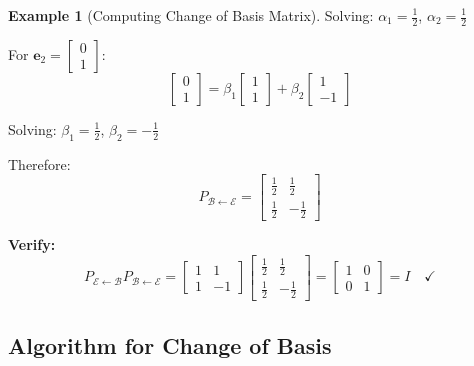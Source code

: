 \documentclass[12pt,a4paper]{article}
\theoremstyle{definition}
\newtheorem{example}{Example}[section]
\begin{document}
\begin{example}[Computing Change of Basis Matrix]
Solving: $\alpha_1 = \frac{1}{2}$, $\alpha_2 = \frac{1}{2}$

For $\mathbf{e}_2 = \begin{bmatrix} 0 \\ 1 \end{bmatrix}$:
\begin{equation}
\begin{bmatrix} 0 \\ 1 \end{bmatrix} = \beta_1\begin{bmatrix} 1 \\ 1 \end{bmatrix} + \beta_2\begin{bmatrix} 1 \\ -1 \end{bmatrix}
\end{equation}

Solving: $\beta_1 = \frac{1}{2}$, $\beta_2 = -\frac{1}{2}$

Therefore:
\begin{equation}
P_{\mathcal{B} \leftarrow \mathcal{E}} = \begin{bmatrix} \frac{1}{2} & \frac{1}{2} \\ \frac{1}{2} & -\frac{1}{2} \end{bmatrix}
\end{equation}

\textbf{Verify:}
\begin{equation}
P_{\mathcal{E} \leftarrow \mathcal{B}} P_{\mathcal{B} \leftarrow \mathcal{E}} = \begin{bmatrix} 1 & 1 \\ 1 & -1 \end{bmatrix} \begin{bmatrix} \frac{1}{2} & \frac{1}{2} \\ \frac{1}{2} & -\frac{1}{2} \end{bmatrix} = \begin{bmatrix} 1 & 0 \\ 0 & 1 \end{bmatrix} = I \quad ✓
\end{equation}
\end{example}

\subsection{Algorithm for Change of Basis}
\end{document}
